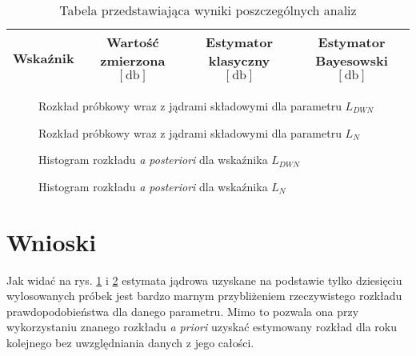 \documentclass[polish,a4paper,11pt]{mwart}
\let\Oldsection\section
\renewcommand{\section}{\FloatBarrier\Oldsection}
\begin{document}
\begin{table}[!tbh]
  \centering
  \caption{Tabela przedstawiająca wyniki poszczególnych analiz}
  \begin{tabular}{|c|c|c|c|}
    \hline
    Wskaźnik & \makecell{Wartość \\ zmierzona \\ $[\si{\decibel}]$} & \makecell{Estymator \\
    klasyczny \\ $[\si{\decibel}]$} & \makecell{Estymator \\ Bayesowski \\ $[\si{\decibel}]$} \\\hline
    
  \end{tabular}
  \label{tab:wyniki}
\end{table}

\begin{figure}[!tbh]
  \centering
  
  \caption{Rozkład próbkowy wraz z jądrami składowymi dla parametru $L_{DWN}$}
  \label{plot:kernel_ldwn}
\end{figure}

\begin{figure}[!tbh]
  \centering
  
  \caption{Rozkład próbkowy wraz z jądrami składowymi dla parametru $L_{N}$}
  \label{plot:kernel_ln}
\end{figure}

\begin{figure}[!tbh]
  \centering
  
  \caption{Histogram rozkładu \textit{a posteriori} dla wskaźnika $L_{DWN}$}
  \label{plot:hist_ldwn}
\end{figure}

\begin{figure}[!tbh]
  \centering
  
  \caption{Histogram rozkładu \textit{a posteriori} dla wskaźnika $L_{N}$}
  \label{plot:hist_ln}
\end{figure}

\section{Wnioski}

Jak widać na rys. \ref{plot:kernel_ldwn} i \ref{plot:kernel_ln} estymata jądrowa
uzyskane na podstawie tylko dziesięciu wylosowanych próbek jest bardzo marnym
przybliżeniem rzeczywistego rozkładu prawdopodobieństwa dla danego parametru.
Mimo to pozwala ona przy wykorzystaniu znanego rozkładu \textit{a priori}
uzyskać estymowany rozkład dla roku kolejnego bez uwzględniania danych z jego
całości.
\end{document}
